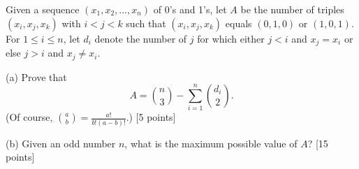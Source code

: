 Given a sequence $(x_1,x_2,\ldots, x_n)$ of 0's and 1's, let $A$ be the number of triples $(x_i,x_j,x_k)$ with $i<j<k$ such that $(x_i,x_j,x_k)$ equals $(0,1,0)$ or $(1,0,1)$.  For $1\leq i \leq n$,  let $d_i$ denote the number of $j$ for which either $j < i$ and $x_j = x_i$ or else $j > i$ and $x_j\neq x_i$.

(a) Prove that \[A = \binom n3 - \sum_{i=1}^n\binom{d_i}2.\](Of course, $\textstyle\binom ab = \tfrac{a!}{b!(a-b)!}$.) [5 points]

(b) Given an odd number $n$,  what is the maximum possible value of $A$? [15 points]